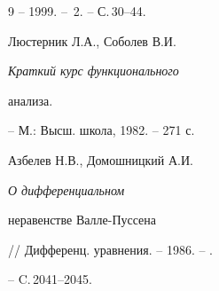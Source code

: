 \begin{thebibliography}{9}
-- 1999. -- \No\,2. -- С.\,30--44.




Люстерник Л.А., Соболев В.И. {\em Краткий курс функционального


анализа.} -- М.: Высш. школа, 1982. -- 271 с.




Азбелев Н.В., Домошницкий А.И. {\em О дифференциальном


неравенстве Валле-Пуссена} // Дифференц. уравнения. -- 1986. -- .


-- C.\,2041--2045.





\end{thebibliography}





\vskip 2cm









\label{end}








